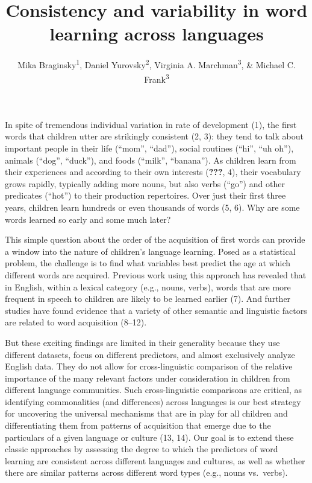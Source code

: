 \documentclass[english,man]{apa6}
\title{Consistency and variability in word learning across languages}
\author{Mika Braginsky\textsuperscript{1}, Daniel Yurovsky\textsuperscript{2}, Virginia A. Marchman\textsuperscript{3}, \& Michael C. Frank\textsuperscript{3}}
\affiliation{
    \vspace{0.5cm}
          \textsuperscript{1} Department of Brain and Cognitive Sciences, Massachusetts Institute of
Technology\\
          \textsuperscript{2} Department of Psychology, University of Chicago\\
          \textsuperscript{3} Department of Psychology, Stanford University  }
\theoremstyle{definition}
\theoremstyle{definition}
\theoremstyle{definition}
\theoremstyle{remark}
\begin{document}
\maketitle

\setcounter{secnumdepth}{0}



In spite of tremendous individual variation in rate of development (1),
the first words that children utter are strikingly consistent (2, 3):
they tend to talk about important people in their life (\enquote{mom},
\enquote{dad}), social routines (\enquote{hi}, \enquote{uh oh}), animals
(\enquote{dog}, \enquote{duck}), and foods (\enquote{milk},
\enquote{banana}). As children learn from their experiences and
according to their own interests ({\textbf{???}}, 4), their vocabulary
grows rapidly, typically adding more nouns, but also verbs
(\enquote{go}) and other predicates (\enquote{hot}) to their production
repertoires. Over just their first three years, children learn hundreds
or even thousands of words (5, 6). Why are some words learned so early
and some much later?

This simple question about the order of the acquisition of first words
can provide a window into the nature of children's language learning.
Posed as a statistical problem, the challenge is to find what variables
best predict the age at which different words are acquired. Previous
work using this approach has revealed that in English, within a lexical
category (e.g., nouns, verbs), words that are more frequent in speech to
children are likely to be learned earlier (7). And further studies have
found evidence that a variety of other semantic and linguistic factors
are related to word acquisition (8--12).

But these exciting findings are limited in their generality because they
use different datasets, focus on different predictors, and almost
exclusively analyze English data. They do not allow for cross-linguistic
comparison of the relative importance of the many relevant factors under
consideration in children from different language communities. Such
cross-linguistic comparisons are critical, as identifying commonalities
(and differences) across languages is our best strategy for uncovering
the universal mechanisms that are in play for all children and
differentiating them from patterns of acquisition that emerge due to the
particulars of a given language or culture (13, 14). Our goal is to
extend these classic approaches by assessing the degree to which the
predictors of word learning are consistent across different languages
and cultures, as well as whether there are similar patterns across
different word types (e.g., nouns vs.~verbs).
\end{document}
